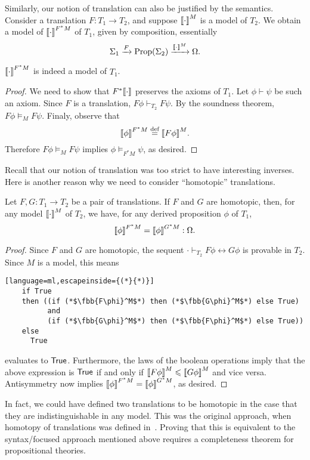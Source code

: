 \documentclass[../main.tex]{subfiles}
\begin{document}
Similarly, our notion of translation can also be justified by the
semantics. Consider a translation \(F: T_1 \to T_2\), and suppose
\({\left\llbracket{\cdot}\right\rrbracket}^M\) is a model of \(T_2\). We obtain a model of
\({\left\llbracket{\cdot}\right\rrbracket}^{F^* M}\) of \(T_1\), given by composition, essentially
\[%
  \Sigma_1 \xrightarrow{F} \text{Prop}(\Sigma_2) \xrightarrow{\fbb{\cdot}^M}
  \Omega.
\]%
\begin{proposition}
  \({\left\llbracket{\cdot}\right\rrbracket}^{F^* M}\) is indeed a model of \(T_1\).
\end{proposition}
\begin{proof}
  We need to show that \(F^*{\left\llbracket{\cdot}\right\rrbracket}\) preserves the axioms of \(T_1\). Let
  \(\phi \vdash \psi\) be such an axiom. Since \(F\) is a translation, \(F\phi
  \vdash_{T_2} F\psi\). By the soundness theorem, \(F\phi \vDash_M
  F\psi\). Finaly, observe that
  \[%
    \fbb{\phi}^{F^* M} \eqdef \fbb{F\phi}^M.
  \]%
  Therefore \(F\phi \vDash_M F\psi\) implies \(\phi \vDash_{F^* M} \psi\), as
  desired.
\end{proof}
Recall that our notion of translation was too strict to have interesting
inverses. Here is another reason why we need to consider ``homotopic''
translations.
\begin{proposition}
  Let \(F, G : T_1 \to T_2\) be a pair of translations. If \(F\) and \(G\) are
  homotopic, then, for any model \({\left\llbracket{\cdot}\right\rrbracket}^M\) of \(T_2\), we have, for any
  derived proposition \(\phi\) of \(T_1\),
  \[%
    \fbb{\phi}^{F^* M} = \fbb{\phi}^{G^* M} : \Omega.
  \]%
\end{proposition}
\begin{proof}
  Since \(F\) and \(G\) are homotopic, the sequent \(\cdot \vdash_{T_2} F\phi
  \leftrightarrow G\phi\) is provable in \(T_2\). Since \(M\) is a model, this
  means
  \begin{lstlisting}[language=ml,escapeinside={(*}{*)}]
    if True
    then ((if (*$\fbb{F\phi}^M$*) then (*$\fbb{G\phi}^M$*) else True)
          and
          (if (*$\fbb{G\phi}^M$*) then (*$\fbb{F\phi}^M$*) else True))
    else
      True      
  \end{lstlisting}
  evaluates to \(\operatorname{{\mathsf{True}}}\). Furthermore, the laws of the boolean operations imply
  that the above expression is \(\operatorname{{\mathsf{True}}}\) if and only if
  \({\left\llbracket{F\phi}\right\rrbracket}^M \leqslant {\left\llbracket{G\phi}\right\rrbracket}^M\) and vice versa. Antisymmetry now implies
  \({\left\llbracket{\phi}\right\rrbracket}^{F^* M} = {\left\llbracket{\phi}\right\rrbracket}^{G^* M}\), as desired.
\end{proof}
In fact, we could have defined two translations to be homotopic in the case that
they are indistinguishable in any model. This was the original approach, when
homotopy of translations was defined in~\cite{Ahlbrandt1986}. Proving that this
is equivalent to the syntax\-/focused approach mentioned above requires a
completeness theorem for propositional theories.
\end{document}

